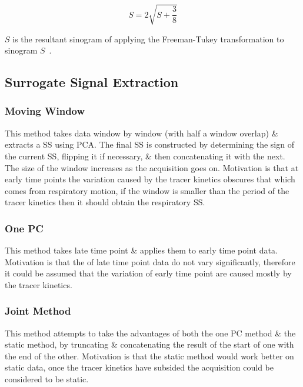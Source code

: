         \begin{equation}
            S = 2 \sqrt{S + \frac{3}{8}}
        \end{equation}
        
        \noindent $S$ is the resultant sinogram of applying the Freeman-Tukey transformation to sinogram $S$~\cite{Freeman1950TransformationsRoot}.
    
    \subsection{Surrogate Signal Extraction} \label{sec:surrogate_signal_extraction}
        \subsubsection{Moving Window} \label{sec:moving_window}
            This method takes data window by window (with half a window overlap) \& extracts a \gls{SS} using \gls{PCA}. The final \gls{SS} is constructed by determining the sign of the current \gls{SS}, flipping it if necessary, \& then concatenating it with the next. The size of the window increases as the acquisition goes on. Motivation is that at early time points the variation caused by the tracer kinetics obscures that which comes from respiratory motion, if the window is smaller than the period of the tracer kinetics then it should obtain the respiratory \gls{SS}.
        
        \subsubsection{One \gls{PC}} \label{sec:one_pc}
            This method takes late time point  \& applies them to early time point data. Motivation is that the  of late time point data do not vary significantly, therefore it could be assumed that the variation of early time point  are caused mostly by the tracer kinetics.
        
        \subsubsection{Joint Method} \label{sec:joint_method}
            This method attempts to take the advantages of both the one \gls{PC} method \& the static method, by truncating \& concatenating the result of the start of one with the end of the other. Motivation is that the static method would work better on static data, once the tracer kinetics have subsided the acquisition could be considered to be static.
    
